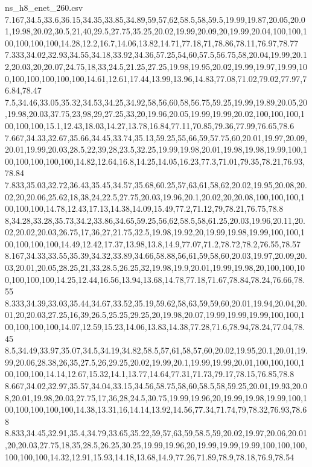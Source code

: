 \begin{filecontents*}[overwrite]{ns_h8_enet_260.csv}
7.167,34.5,33.6,36.15,34.35,33.85,34.89,59,57,62,58.5,58,59.5,19.99,19.87,20.05,20.01,19.98,20.02,30.5,21,40,29.5,27.75,35.25,20.02,19.99,20.09,20,19.99,20.04,100,100,100,100,100,100,14.28,12.2,16.7,14.06,13.82,14.71,77.18,71,78.86,78.11,76.97,78.77
7.333,34.02,32.93,34.55,34.18,33.92,34.36,57.25,54,60,57.5,56.75,58,20.04,19.99,20.12,20.03,20,20.07,24.75,18,33,24.5,21.25,27.25,19.98,19.95,20.02,19.99,19.97,19.99,100,100,100,100,100,100,14.61,12.61,17.44,13.99,13.96,14.83,77.08,71.02,79.02,77.97,76.84,78.47
7.5,34.46,33.05,35.32,34.53,34.25,34.92,58,56,60,58,56.75,59.25,19.99,19.89,20.05,20,19.98,20.03,37.75,23,98,29,27.25,33,20,19.96,20.05,19.99,19.99,20.02,100,100,100,100,100,100,15.1,12.43,18.03,14.27,13.78,16.84,77.11,70.85,79.36,77.99,76.65,78.6
7.667,34.33,32.67,35.66,34.45,33.74,35.13,59.25,55,66,59,57.75,60,20.01,19.97,20.09,20.01,19.99,20.03,28.5,22,39,28,23.5,32.25,19.99,19.98,20.01,19.98,19.98,19.99,100,100,100,100,100,100,14.82,12.64,16.8,14.25,14.05,16.23,77.3,71.01,79.35,78.21,76.93,78.84
7.833,35.03,32.72,36.43,35.45,34.57,35.68,60.25,57,63,61,58,62,20.02,19.95,20.08,20.02,20,20.06,25.62,18,38,24,22.5,27.75,20.03,19.96,20.1,20.02,20,20.08,100,100,100,100,100,100,14.78,12.43,17.13,14.38,14.09,15.49,77.2,71.12,79,78.21,76.75,78.8
8,34.28,33.28,35.73,34.2,33.86,34.65,59.25,56,62,58.5,58,61.25,20.03,19.96,20.11,20.02,20.02,20.03,26.75,17,36,27,21.75,32.5,19.98,19.92,20,19.99,19.98,19.99,100,100,100,100,100,100,14.49,12.42,17.37,13.98,13.8,14.9,77.07,71.2,78.72,78.2,76.55,78.57
8.167,34.33,33.55,35.39,34.32,33.89,34.66,58.88,56,61,59,58,60,20.03,19.97,20.09,20.03,20.01,20.05,28.25,21,33,28.5,26.25,32,19.98,19.9,20.01,19.99,19.98,20,100,100,100,100,100,100,14.25,12.44,16.56,13.94,13.68,14.78,77.18,71.67,78.84,78.24,76.66,78.55
8.333,34.39,33.03,35.44,34.67,33.52,35.19,59.62,58,63,59,59,60,20.01,19.94,20.04,20.01,20,20.03,27.25,16,39,26.5,25.25,29.25,20,19.98,20.07,19.99,19.99,19.99,100,100,100,100,100,100,14.07,12.59,15.23,14.06,13.83,14.38,77.28,71.6,78.94,78.24,77.04,78.45
8.5,34.49,33.97,35.07,34.5,34.19,34.82,58.5,57,61,58,57,60,20.02,19.95,20.1,20.01,19.99,20.06,28.38,26,35,27.5,26,29.25,20.02,19.99,20.1,19.99,19.99,20.01,100,100,100,100,100,100,14.14,12.67,15.32,14.1,13.77,14.64,77.31,71.73,79.17,78.15,76.85,78.8
8.667,34.02,32.97,35.57,34.04,33.15,34.56,58.75,58,60,58.5,58,59.25,20.01,19.93,20.08,20.01,19.98,20.03,27.75,17,36,28,24.5,30.75,19.99,19.96,20,19.99,19.98,19.99,100,100,100,100,100,100,14.38,13.31,16,14.14,13.92,14.56,77.34,71.74,79,78.32,76.93,78.68
8.833,34.45,32.91,35.4,34.79,33.65,35.22,59,57,63,59,58.5,59,20.02,19.97,20.06,20.01,20,20.03,27.75,18,35,28.5,26.25,30.25,19.99,19.96,20,19.99,19.99,19.99,100,100,100,100,100,100,14.32,12.91,15.93,14.18,13.68,14.9,77.26,71.89,78.9,78.18,76.9,78.54

\end{filecontents*}
